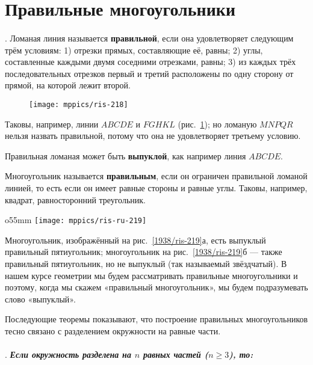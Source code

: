 \section{Правильные многоугольники}

\paragraph{}\label{1938/212}
.
Ломаная линия называется \textbf{правильной}, если она удовлетворяет следующим трём условиям:
1) отрезки прямых, составляющие её, равны;
2) углы, составленные каждыми двумя соседними отрезками, равны;
3) из каждых трёх последовательных отрезков первый и третий расположены по одну сторону от прямой, на которой лежит второй.

\begin{figure}[h]
\centering
\texttt{[image: mppics/ris-218]}
\caption{}\label{1938/ris-218}
\end{figure}

Таковы, например, линии $ABCDE$ и $FGHKL$ (рис.~\ref{1938/ris-218});
но ломаную $MNPQR$ нельзя назвать правильной, потому что она не удовлетворяет третьему условию.

Правильная ломаная может быть \textbf{выпуклой}, как например линия $ABCDE$.

Многоугольник называется \textbf{правильным}, если он ограничен правильной ломаной линией, то есть если он имеет равные стороны и равные углы.
Таковы, например, квадрат, равносторонний треугольник.

\begin{wrapfigure}{o}{55mm}
\centering
\texttt{[image: mppics/ris-ru-219]}
\caption{}\label{1938/ris-219}
\end{wrapfigure}

Многоугольник, изображённый на рис.~\ref{1938/ris-219}а, есть выпуклый правильный пятиугольник;
многоугольник на рис.~\ref{1938/ris-219}б — также правильный пятиугольник, но не выпуклый (так называемый звёздчатый).
В нашем курсе геометрии мы будем рассматривать  правильные многоугольники и поэтому, когда мы скажем «правильный многоугольник», мы будем подразумевать слово «выпуклый».

{\sloppy 
Последующие теоремы показывают, что построение правильных многоугольников тесно связано с разделением окружности на равные части.

}

\paragraph{}\label{1938/213}
.
\textbf{\emph{Если окружность разделена на $n$ равных частей ($n\ge 3$), то:}}

